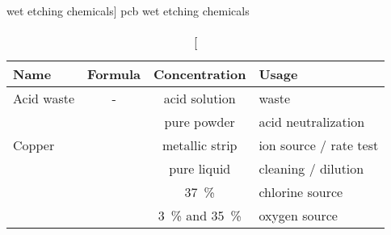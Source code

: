 \documentclass[../main.tex]{subfiles}%
\begin{document}
%
    \Xtable%
    \begin{table}%
        \caption%
            [ wet etching chemicals]%
            {\Gls{pcb} wet etching chemicals}%
        \label{tbl:pcb-etch-chemicals}%
        \begin{tabu}{ p{1.5in} c c p{1.5in} }%
            \toprule%
            \centering\textbf{Name} &%
            \centering\textbf{Formula} &%
            \centering\textbf{Concentration} &%
            \centering\textbf{Usage}\\%
            \toprule%
            Acid waste &%
            - &%
            acid solution &%
            waste\\%
             &%
             &%
            pure powder &%
            acid neutralization\\%
            Copper &%
             &%
            metallic strip &%
            ion source / rate test\\%
             &%
             &%
            pure liquid &%
            cleaning / dilution\\%
             &%
             &%
            \SI{37}{\percent} &%
            chlorine source\\%
             &%
             &%
            \SI{3}{\percent} and \SI{35}{\percent} &%
            oxygen source\\%
            \bottomrule%
        \end{tabu}%
    \end{table}%
\end{document}

